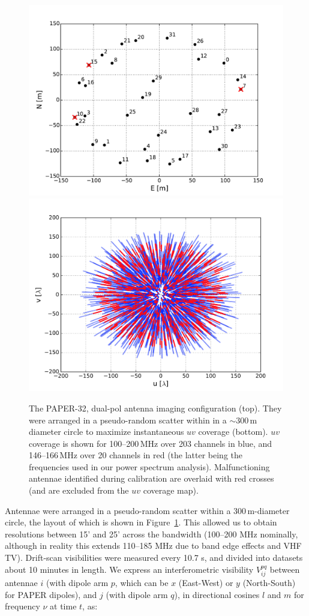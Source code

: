 \begin{figure}[h!]
\centering
\includegraphics[width=0.6\columnwidth]{chapters/eor_window_PAPER/figures/new_antenna_config.pdf}
\includegraphics[width=0.6\columnwidth]{chapters/eor_window_PAPER/figures/uv_coverage_exclbad_overlaid-compressed.png}
\caption[The PAPER-32, dual-pol antenna imaging configuration and \textit{uv} distribution.]{The PAPER-32, dual-pol antenna imaging configuration (top). They were arranged in a pseudo-random scatter within in a $\sim$300\,m diameter circle to maximize instantaneous $uv$ coverage (bottom). $uv$ coverage is shown for 100--200\,MHz over 203 channels in blue, and 146--166\,MHz over 20 channels in red (the latter being the frequencies used in our power spectrum analysis). Malfunctioning antennae identified during calibration are overlaid with red crosses (and are excluded from the $uv$ coverage map).\\}
\label{fig:psa32img_config}
\end{figure}

Antennae were arranged in a pseudo-random scatter within a 300\,m-diameter circle, the layout of which is shown in Figure~\ref{fig:psa32img_config}. This allowed us to obtain resolutions between 15' and 25' across the bandwidth (100--200 MHz nominally, although in reality this extends 110--185 MHz due to band edge effects and VHF TV). Drift-scan visibilities were measured every 10.7 s, and divided into datasets about 10 minutes in length. We express an interferometric visibility $V^{pq}_{ij}$ between antennae $i$ (with dipole arm $p$, which can be $x$ (East-West) or $y$ (North-South) for PAPER dipoles), and $j$ (with dipole arm $q$), in directional cosines $l$ and $m$ for frequency $\nu$ at time $t$, as:

